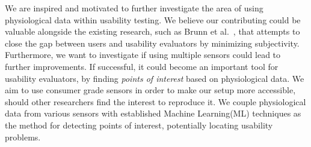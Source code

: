 We are inspired and motivated to further investigate the area of using physiological data within usability testing. We
believe our contributing could be valuable alongside the existing research, such as Brunn et al.~\cite{LH-paper}, that
attempts to close the gap between users and usability evaluators by minimizing subjectivity. Furthermore, we want to
investigate if using multiple sensors could lead to further improvements.
If successful, it could become an important tool for usability evaluators, by finding \textit{points of interest} based on physiological data. 
We aim to use consumer grade sensors in order to make our setup more accessible, should other researchers find the interest to reproduce
it. We couple physiological data from various sensors with established Machine Learning(ML) techniques as the method for
detecting points of interest, potentially locating usability problems.